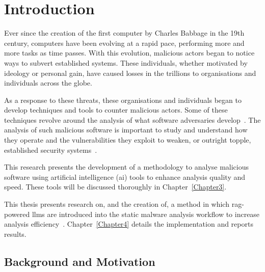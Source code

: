 \chapter{Introduction}\label{sec:Introduction}\label{Chapter1} %
Ever since the creation of the first computer by Charles Babbage in the 19th century, computers
have been evolving at a rapid pace, performing more and more tasks as time passes. With this
evolution, malicious actors began to notice ways to subvert established systems. These
individuals, whether motivated by ideology or personal gain, have caused losses in the trillions to
organisations and individuals across the globe.

As a response to these threats, these organisations and individuals began to develop techniques and
tools to counter malicious actors. Some of these techniques revolve around the analysis of what
software adversaries develop~\cite{abrazak2016rise,mat2021systematic,gaber2024malware}. The
analysis of such malicious software is important to study and understand how they operate and the
vulnerabilities they exploit to weaken, or outright topple, established security
systems~\cite{fedak2020fundamentals,wong2021practice}.

This research presents the development of a methodology to analyse malicious software using
artificial intelligence (\gls{ai}) tools to enhance analysis quality and speed. These tools will be
discussed thoroughly in Chapter~\ref{Chapter3}.

This thesis presents research on, and the creation of, a method in which \gls{rag}-powered
\glspl{llm} are introduced into the static malware analysis workflow to increase analysis
efficiency~\cite{lewis2020retrieval,gao2023retrieval}. Chapter~\ref{Chapter4} details the
implementation and reports results.

\section{Background and Motivation}\label{sec:BackgroundMotivation}

